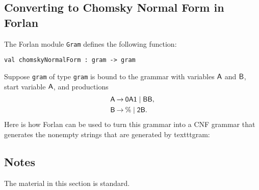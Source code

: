 \subsection*{Converting to Chomsky Normal Form in Forlan}

The Forlan module \texttt{Gram} defines the following function:
\begin{verbatim}
val chomskyNormalForm : gram -> gram
\end{verbatim}
Suppose \texttt{gram} of type \texttt{gram} is bound to the grammar with
variables $\mathsf{A}$ and $\mathsf{B}$, start variable $\mathsf{A}$, and productions
\begin{align*}
  \mathsf{A} &\mathbin{\to} \mathsf{0A1} \mid \mathsf{BB} , \\
  \mathsf{B} &\mathbin{\to} \% \mid \mathsf{2B} .
\end{align*}
Here is how Forlan can be used to turn this grammar into a CNF
grammar that generates the nonempty strings that are generated by
texttt{gram}:


\subsection{Notes}

The material in this section is standard.

